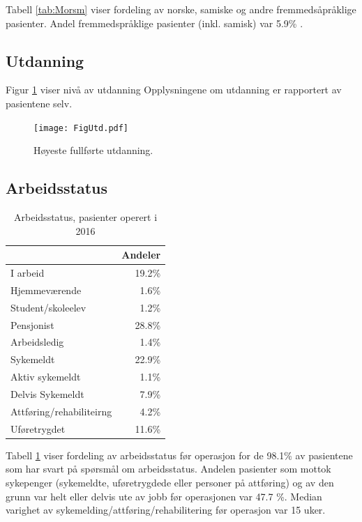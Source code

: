 \documentclass [norsk,a4paper,twoside]{article}\usepackage[]{graphicx}\usepackage[]{color}
\begin{document}
Tabell \ref{tab:Morsm} viser fordeling av norske, samiske og andre fremmedsåpråklige pasienter.
Andel fremmedspråklige 
pasienter (inkl. samisk) var 5.9\% . 


\subsection{Utdanning}
Figur \ref{fig:Utd} viser nivå av utdanning 
Opplysningene om utdanning er rapportert av pasientene selv.



\begin{figure}[ht]
	\centering \texttt{[image: FigUtd.pdf]}
	\caption{\label{fig:Utd} Høyeste fullførte utdanning.}
\end{figure}




\subsection{Arbeidsstatus}

\begin{table}[ht]
\centering
\begin{tabular}{lr}
  \hline
 & Andeler \\ 
  \hline
I arbeid & 19.2\% \\ 
  Hjemmeværende & 1.6\% \\ 
  Student/skoleelev & 1.2\% \\ 
  Pensjonist & 28.8\% \\ 
  Arbeidsledig & 1.4\% \\ 
  Sykemeldt & 22.9\% \\ 
  Aktiv sykemeldt & 1.1\% \\ 
  Delvis Sykemeldt & 7.9\% \\ 
  Attføring/rehabiliteirng & 4.2\% \\ 
  Uføretrygdet & 11.6\% \\ 
   \hline
\end{tabular}
\caption{Arbeidsstatus, pasienter operert i 2016} 
\label{tab:Arb}
\end{table}


Tabell \ref{tab:Arb} viser fordeling av arbeidsstatus før operasjon for de 98.1\% 
av pasientene som har svart på spørsmål om arbeidsstatus.
Andelen pasienter som mottok sykepenger (sykemeldte, uføretrygdede eller personer 
på attføring) og av den grunn var helt eller delvis ute av jobb før operasjonen var 
47.7 \%. 
Median varighet av sykemelding/attføring/rehabilitering  før operasjon var 
15 uker.
\end{document}
